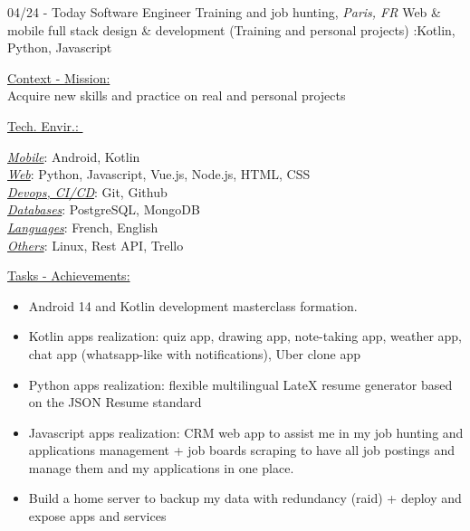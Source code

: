 \documentclass[]{friggeri-cv}
\begin{document}
\begin{entrylist}
  \entry
    {04/24 - Today}
    {Software Engineer}
    {Training and job hunting, \textit{Paris, FR}}
    {Web \& mobile full stack design \& development (Training and personal projects) :\hspace*{55mm}Kotlin, Python, Javascript}
\end{entrylist}
\vspace{-10pt}
\begin{minipage}[t]{0.65\linewidth}
\underline{Context - Mission: }\\
Acquire new skills and practice on real and personal projects\\
\end{minipage} %
\begin{minipage}[t]{0.38\textwidth}
    \underline{Tech. Envir.: }\
    \vspace{1mm}
    
\underline{\textit{Mobile}}: Android, Kotlin\\
\underline{\textit{Web}}: Python, Javascript, Vue.js, Node.js, HTML, CSS\\
\underline{\textit{Devops, CI/CD}}: Git, Github\\
\underline{\textit{Databases}}: PostgreSQL, MongoDB\\
\underline{\textit{Languages}}: French, English\\
\underline{\textit{Others}}: Linux, Rest API, Trello
    \end{minipage}
\vspace{1.5mm}
\underline{Tasks - Achievements: }\\

\begin{itemize}
\setlength{\itemsep}{1pt}
\setlength{\parskip}{0pt}
\setlength{\parsep}{0pt}

\item Android 14 and Kotlin development masterclass formation.
\item Kotlin apps realization: quiz app, drawing app, note-taking app, weather app, chat app (whatsapp-like with notifications), Uber clone app
\item Python apps realization: flexible multilingual LateX resume generator based on the JSON Resume standard
\item Javascript apps realization: CRM web app to assist me in my job hunting and applications management + job boards scraping to have all job postings and manage them and my applications in one place.
\item Build a home server to backup my data with redundancy (raid) + deploy and expose apps and services
\end{itemize}
\end{document}
